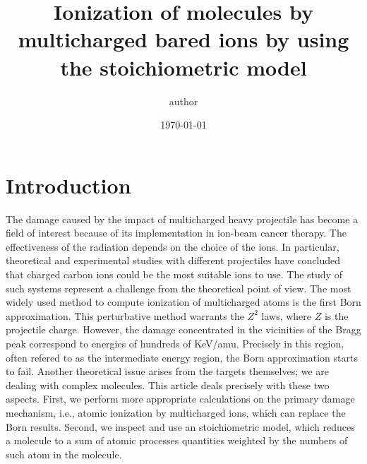 \documentclass[preprint,12pt]{article}
\begin{document}
\title{Ionization of molecules by multicharged bared ions by using the
stoichiometric model}
\author{author}
\date{\today }



\maketitle

\begin{abstract}
\end{abstract}


\section{Introduction}

The damage caused by the impact of multicharged heavy projectile has 
become a field of interest because of its implementation in ion-beam 
cancer therapy. The effectiveness of the radiation depends on the 
choice of the ions. In particular, theoretical and experimental studies 
with different projectiles have concluded that charged carbon ions 
could be the most suitable ions to use. The study of such systems 
represent a challenge from the theoretical point of view. The most 
widely used method to compute ionization of multicharged atoms is the 
first Born approximation. 
This perturbative method warrants the $Z^{2}$ laws, where $Z$ is the 
projectile charge. However, the damage concentrated in the vicinities 
of the Bragg peak correspond to energies of hundreds of KeV/amu. 
Precisely in this region, often refered to as the intermediate energy 
region, the Born approximation starts to fail. Another theoretical 
issue arises from the targets themselves; we are dealing with complex 
molecules. This article deals precisely with these two aspects. 
First, we perform more appropriate calculations on the primary damage 
mechanism, i.e., atomic ionization by multicharged ions, which can 
replace the Born results. Second, we inspect and use an stoichiometric 
model, which reduces a molecule to a sum of atomic processes quantities 
weighted by the numbers of such atom in the molecule.
\end{document}
